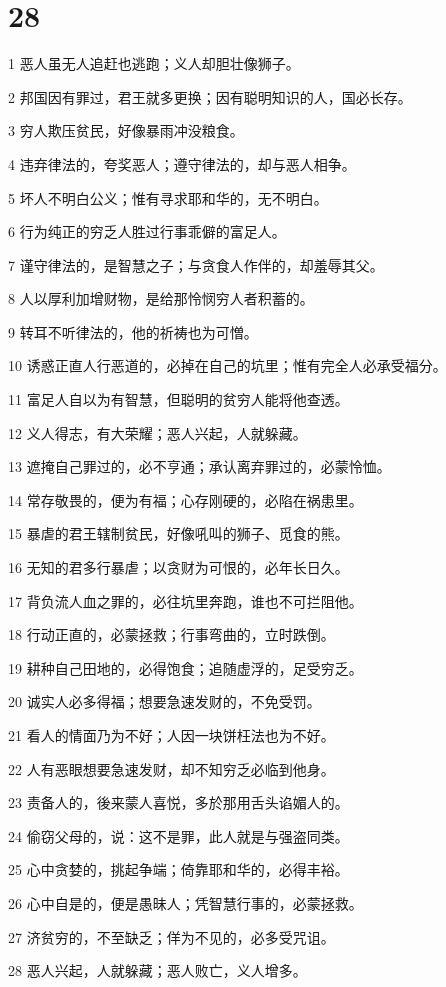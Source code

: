 \chapter{28}

\par 1 恶人虽无人追赶也逃跑；义人却胆壮像狮子。
\par 2 邦国因有罪过，君王就多更换；因有聪明知识的人，国必长存。
\par 3 穷人欺压贫民，好像暴雨冲没粮食。
\par 4 违弃律法的，夸奖恶人；遵守律法的，却与恶人相争。
\par 5 坏人不明白公义；惟有寻求耶和华的，无不明白。
\par 6 行为纯正的穷乏人胜过行事乖僻的富足人。
\par 7 谨守律法的，是智慧之子；与贪食人作伴的，却羞辱其父。
\par 8 人以厚利加增财物，是给那怜悯穷人者积蓄的。
\par 9 转耳不听律法的，他的祈祷也为可憎。
\par 10 诱惑正直人行恶道的，必掉在自己的坑里；惟有完全人必承受福分。
\par 11 富足人自以为有智慧，但聪明的贫穷人能将他查透。
\par 12 义人得志，有大荣耀；恶人兴起，人就躲藏。
\par 13 遮掩自己罪过的，必不亨通；承认离弃罪过的，必蒙怜恤。
\par 14 常存敬畏的，便为有福；心存刚硬的，必陷在祸患里。
\par 15 暴虐的君王辖制贫民，好像吼叫的狮子、觅食的熊。
\par 16 无知的君多行暴虐；以贪财为可恨的，必年长日久。
\par 17 背负流人血之罪的，必往坑里奔跑，谁也不可拦阻他。
\par 18 行动正直的，必蒙拯救；行事弯曲的，立时跌倒。
\par 19 耕种自己田地的，必得饱食；追随虚浮的，足受穷乏。
\par 20 诚实人必多得福；想要急速发财的，不免受罚。
\par 21 看人的情面乃为不好；人因一块饼枉法也为不好。
\par 22 人有恶眼想要急速发财，却不知穷乏必临到他身。
\par 23 责备人的，後来蒙人喜悦，多於那用舌头谄媚人的。
\par 24 偷窃父母的，说：这不是罪，此人就是与强盗同类。
\par 25 心中贪婪的，挑起争端；倚靠耶和华的，必得丰裕。
\par 26 心中自是的，便是愚昧人；凭智慧行事的，必蒙拯救。
\par 27 济贫穷的，不至缺乏；佯为不见的，必多受咒诅。
\par 28 恶人兴起，人就躲藏；恶人败亡，义人增多。

